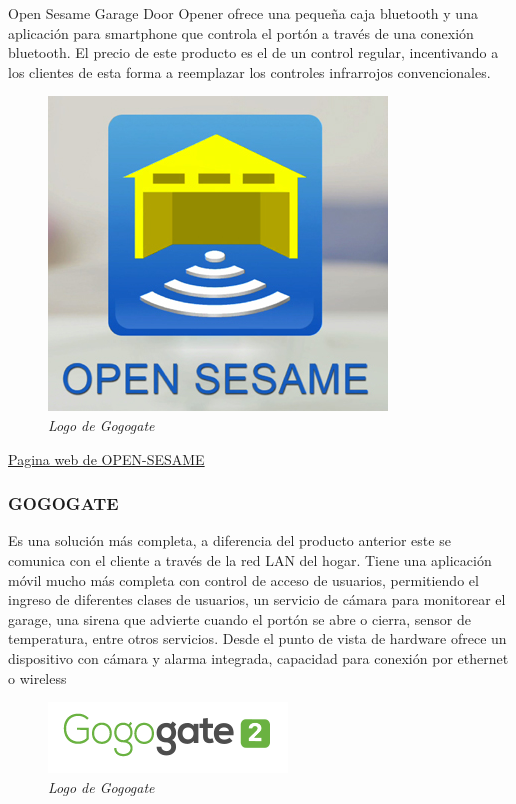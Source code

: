 \documentclass[16pt, article,notitlepage]{article}
\begin{document}
Open Sesame Garage Door Opener ofrece una pequeña caja bluetooth y una aplicación para smartphone que controla el portón a través de una conexión bluetooth. El precio de este producto es el de un control regular, incentivando a los clientes de esta forma a reemplazar los controles infrarrojos convencionales.

\begin{figure}[H] 
	\centering
	\includegraphics[scale=0.7]{./images/opensesame.png}
	\caption{\textit{ Logo de Gogogate}}
\end{figure}

\href{https://www.mygarageopener.com/}{Pagina web de OPEN-SESAME}



\subsubsection{GOGOGATE}

Es una solución más completa, a diferencia del producto anterior este se comunica con el cliente a través de la red LAN del hogar.  Tiene una aplicación móvil mucho más completa con control de acceso de usuarios, permitiendo el ingreso de diferentes clases de usuarios, un servicio de cámara para monitorear el garage, una sirena que advierte cuando el portón se abre o cierra, sensor de temperatura, entre otros servicios.  Desde el punto de vista de hardware ofrece un dispositivo con cámara y alarma integrada, capacidad para conexión por ethernet o wireless

\begin{figure}[H] 
	\centering
	\includegraphics[scale=0.7]{./images/gogogate_logo.png}
	\caption{\textit{ Logo de Gogogate}}
\end{figure}
\end{document}
